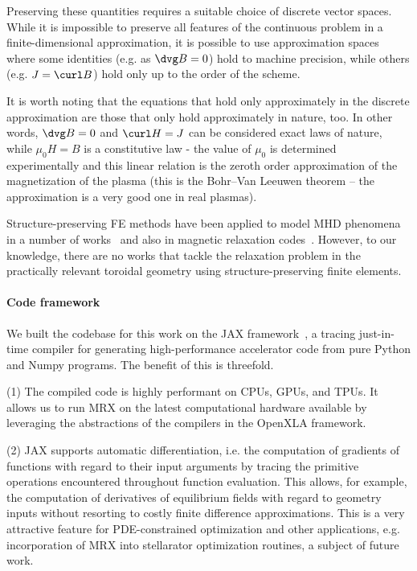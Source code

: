 \documentclass[%
 reprint,
 superscriptaddress,
 amsmath,amssymb,
 aps, nofootinbib, floatfix]{revtex4-2}
\begin{document}
Preserving these quantities requires a suitable choice of discrete vector spaces. While it is impossible to preserve all features of the continuous problem in a finite-dimensional approximation, it is possible to use approximation spaces where some identities (e.g. as $\dvg B = 0$) hold to machine precision, while others (e.g. $J = \curl B$) hold only up to the order of the scheme. 

\begin{remark}
    It is worth noting that the equations that hold only approximately in the discrete approximation are those that only hold approximately in nature, too. In other words, $\dvg B = 0$ and $\curl H = J$ can be considered exact laws of nature, while $\mu_0 H = B$ is a constitutive law - the value of $\mu_0$ is determined experimentally and this linear relation is the zeroth order approximation of the magnetization of the plasma (this is the Bohr–Van Leeuwen theorem \citep[\S52]{landau_statistical_1996} -- the approximation is a very good one in real plasmas).
\end{remark}

Structure-preserving FE methods have been applied to model MHD phenomena in a number of works~\cite{hu_stable_2017, gawlik_structure-preserving_2021, hu_helicity-conservative_2021, gawlik_finite_2022, holderied_magneto-hydrodynamic_2022, carlier_variational_2025} and also in magnetic relaxation codes~\cite{bressan_2023_relaxation, he_topology-preserving_2025, mao2026structure}. However, to our knowledge, there are no works that tackle the relaxation problem in the practically relevant toroidal geometry using structure-preserving finite elements.

\paragraph{Code framework}
%
We built the codebase for this work on the JAX framework~\cite{frostig_compiling_2018, noauthor_jax_nodate}, a tracing just-in-time compiler for generating high-performance accelerator code from pure Python and Numpy programs. The benefit of this is threefold.

(1) The compiled code is highly performant on CPUs, GPUs, and TPUs. It allows us to run MRX on the latest computational hardware available by leveraging the abstractions of the compilers in the OpenXLA framework.

(2) JAX supports automatic differentiation, i.e. the computation of gradients of functions with regard to their input arguments by tracing the primitive operations encountered throughout function evaluation. This allows, for example, the computation of derivatives of equilibrium fields with regard to geometry inputs without resorting to costly finite difference approximations. This is a very attractive feature for PDE-constrained optimization and other  applications, e.g. incorporation of MRX into  stellarator optimization routines, a subject of future work. 
\end{document}
